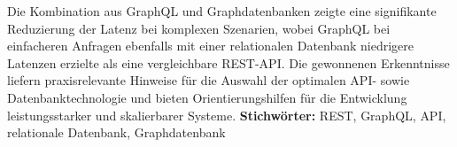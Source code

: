 \newline
\noindent
Die Kombination aus GraphQL und Graphdatenbanken zeigte eine signifikante Reduzierung der Latenz bei komplexen Szenarien, wobei GraphQL bei einfacheren Anfragen ebenfalls mit einer relationalen Datenbank niedrigere Latenzen erzielte als eine vergleichbare REST-API. Die gewonnenen Erkenntnisse liefern praxisrelevante Hinweise für die Auswahl der optimalen API- sowie Datenbanktechnologie und bieten Orientierungshilfen für die Entwicklung leistungsstarker und skalierbarer Systeme.
\newline
\noindent
\textbf{Stichwörter:} REST, GraphQL, API, relationale Datenbank, Graphdatenbank
